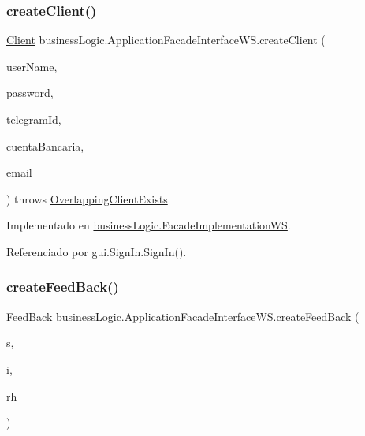 \subsubsection{\texorpdfstring{createClient()}{createClient()}}
{\footnotesize\ttfamily \mbox{\hyperlink{classdomain_1_1_client}{Client}} business\+Logic.\+Application\+Facade\+Interface\+W\+S.\+create\+Client (\begin{DoxyParamCaption}\item[{String}]{user\+Name,  }\item[{String}]{password,  }\item[{String}]{telegram\+Id,  }\item[{String}]{cuenta\+Bancaria,  }\item[{String}]{email }\end{DoxyParamCaption}) throws \mbox{\hyperlink{classexceptions_1_1_overlapping_client_exists}{Overlapping\+Client\+Exists}}}



Implementado en \mbox{\hyperlink{classbusiness_logic_1_1_facade_implementation_w_s_a2c5f0e41c6463d8e5c7d4b89ea3f676f}{business\+Logic.\+Facade\+Implementation\+WS}}.



Referenciado por gui.\+Sign\+In.\+Sign\+In().

\mbox{\label{interfacebusiness_logic_1_1_application_facade_interface_w_s_a3fd4fdf7b7efaef7ff89ee7273f5be22}} 
\subsubsection{\texorpdfstring{createFeedBack()}{createFeedBack()}}
{\footnotesize\ttfamily \mbox{\hyperlink{classdomain_1_1_feed_back}{Feed\+Back}} business\+Logic.\+Application\+Facade\+Interface\+W\+S.\+create\+Feed\+Back (\begin{DoxyParamCaption}\item[{String}]{s,  }\item[{int}]{i,  }\item[{\mbox{\hyperlink{classdomain_1_1_rural_house}{Rural\+House}}}]{rh }\end{DoxyParamCaption})}



